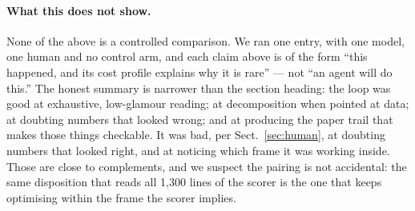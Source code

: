 \paragraph{What this does not show.}
None of the above is a controlled comparison. We ran one entry, with one model, one
human and no control arm, and each claim above is of the form ``this happened, and
its cost profile explains why it is rare'' --- not ``an agent will do this.'' The
honest summary is narrower than the section heading: the loop was good at exhaustive,
low-glamour reading; at decomposition when pointed at data; at doubting numbers that
looked wrong; and at producing the paper trail that makes those things checkable. It
was bad, per Sect.~\ref{sec:human}, at doubting numbers that looked right, and at
noticing which frame it was working inside. Those are close to complements, and we
suspect the pairing is not accidental: the same disposition that reads all 1{,}300
lines of the scorer is the one that keeps optimising within the frame the scorer
implies.

%
%
%
%
